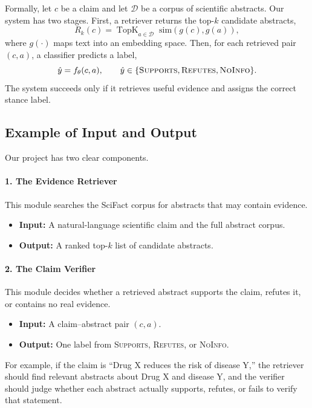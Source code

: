 \documentclass[11pt]{article}
\begin{document}
Formally, let $c$ be a claim and let $\mathcal{D}$ be a corpus of scientific abstracts. Our system has two stages. First, a retriever returns the top-$k$ candidate abstracts,
\begin{equation}
R_k(c) = \operatorname{TopK}_{a \in \mathcal{D}}\; \mathrm{sim}(g(c), g(a)),
\end{equation}
where $g(\cdot)$ maps text into an embedding space. Then, for each retrieved pair $(c,a)$, a classifier predicts a label,
\begin{equation}
\hat{y} = f_{\theta}(c,a), \qquad \hat{y} \in \{\textsc{Supports},\textsc{Refutes},\textsc{NoInfo}\}.
\end{equation}
The system succeeds only if it retrieves useful evidence and assigns the correct stance label.

\subsection{Example of Input and Output}
Our project has two clear components.

\paragraph{1. The Evidence Retriever}
This module searches the SciFact corpus for abstracts that may contain evidence.
\begin{itemize}
    \item \textbf{Input:} A natural-language scientific claim and the full abstract corpus.
    \item \textbf{Output:} A ranked top-$k$ list of candidate abstracts.
\end{itemize}

\paragraph{2. The Claim Verifier}
This module decides whether a retrieved abstract supports the claim, refutes it, or contains no real evidence.
\begin{itemize}
    \item \textbf{Input:} A claim--abstract pair $(c,a)$.
    \item \textbf{Output:} One label from \textsc{Supports}, \textsc{Refutes}, or \textsc{NoInfo}.
\end{itemize}

For example, if the claim is ``Drug X reduces the risk of disease Y,'' the retriever should find relevant abstracts about Drug X and disease Y, and the verifier should judge whether each abstract actually supports, refutes, or fails to verify that statement.
\end{document}
